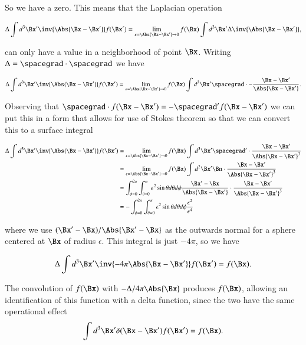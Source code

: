 So we have a zero.  This means that the Laplacian operation 

\begin{equation}\label{eqn:relativisticElectrodynamicsL18:300}
\Delta \int d^3 \Bx' \inv{\Abs{\Bx - \Bx'} } f(\Bx') 
=
\lim_{\epsilon = \Abs{\Bx -\Bx'} \rightarrow 0}
f(\Bx) \int d^3 \Bx' \Delta \inv{\Abs{\Bx - \Bx'}},
\end{equation}

can only have a value in a neighborhood of point $\Bx$.  Writing $\Delta = \spacegrad \cdot \spacegrad$ we have

\begin{equation}\label{eqn:relativisticElectrodynamicsL18:320}
\Delta \int d^3 \Bx' \inv{\Abs{\Bx - \Bx'} } f(\Bx') 
=
\lim_{\epsilon = \Abs{\Bx -\Bx'} \rightarrow 0}
f(\Bx) \int d^3 \Bx' \spacegrad \cdot -\frac{\Bx - \Bx'}{\Abs{\Bx - \Bx'}}.
\end{equation}

Observing that $\spacegrad \cdot f(\Bx -\Bx') = -\spacegrad' f(\Bx - \Bx')$ we can put this in a form that allows for use of Stokes theorem so that we can convert this to a surface integral

\begin{align*}
\Delta \int d^3 \Bx' \inv{\Abs{\Bx - \Bx'} } f(\Bx') 
&=
\lim_{\epsilon = \Abs{\Bx -\Bx'} \rightarrow 0}
f(\Bx) \int d^3 \Bx' \spacegrad' \cdot \frac{\Bx - \Bx'}{\Abs{\Bx - \Bx'}^3} \\
&=
\lim_{\epsilon = \Abs{\Bx -\Bx'} \rightarrow 0}
f(\Bx) \int d^2 \Bx' \Bn \cdot \frac{\Bx - \Bx'}{\Abs{\Bx - \Bx'}^3} \\
&= \int_{\phi=0}^{2\pi} \int_{\theta = 0}^\pi \epsilon^2 \sin\theta d\theta d\phi 
\frac{\Bx' - \Bx}{\Abs{\Bx - \Bx'}} \cdot \frac{\Bx - \Bx'}{\Abs{\Bx - \Bx'}^3} \\
&= -\int_{\phi=0}^{2\pi} \int_{\theta = 0}^\pi \epsilon^2 \sin\theta d\theta d\phi \frac{\epsilon^2}{\epsilon^4}
\end{align*}

where we use $(\Bx' - \Bx)/\Abs{\Bx' - \Bx}$ as the outwards normal for a sphere centered at $\Bx$ of radius $\epsilon$.  This integral is just $-4 \pi$, so we have

\begin{equation}\label{eqn:relativisticElectrodynamicsL18:360}
\Delta \int d^3 \Bx' \inv{-4 \pi \Abs{\Bx - \Bx'} } f(\Bx') 
=
f(\Bx).
\end{equation}

The convolution of $f(\Bx)$ with $-\Delta/4 \pi \Abs{\Bx}$ produces $f(\Bx)$, allowing an identification of this function with a delta function, since the two have the same operational effect
\begin{equation}\label{eqn:relativisticElectrodynamicsL18:380}
\int d^3 \Bx' \delta(\Bx - \Bx') f(\Bx') 
=
f(\Bx).
\end{equation}

